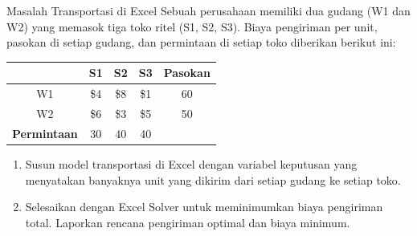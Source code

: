 \begin{ex}{Masalah Transportasi di Excel}{}
\label{ex:excel-transportation}
 Sebuah perusahaan memiliki dua gudang (W1 dan W2) yang memasok tiga toko ritel (S1, S2, S3). Biaya pengiriman per unit, pasokan di setiap gudang, dan permintaan di setiap toko diberikan berikut ini:

\begin{center}
\begin{tabular}{c|c|c|c|c}
 & S1 & S2 & S3 & \textbf{Pasokan} \\
\hline
W1 & \$4 & \$8 & \$1 & 60 \\
W2 & \$6 & \$3 & \$5 & 50 \\
\hline
\textbf{Permintaan} & 30 & 40 & 40 & \\
\end{tabular}
\par{}\label{tab:software-excel-tab03}%

\end{center}

\begin{enumerate}
\item Susun model transportasi di Excel dengan variabel keputusan yang menyatakan banyaknya unit yang dikirim dari setiap gudang ke setiap toko.
\item Selesaikan dengan Excel Solver untuk meminimumkan biaya pengiriman total. Laporkan rencana pengiriman optimal dan biaya minimum.
\end{enumerate}
\exrefs{\S\ref{sec:excel-solver}, \OOExcelTransportationSectionReference}
\end{ex}

